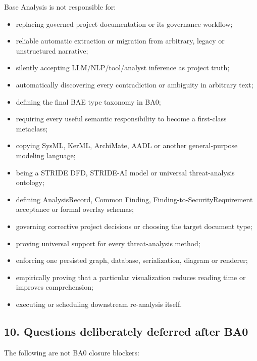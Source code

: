 \documentclass[
  10pt,
]{article}
\providecommand{\tightlist}{%
  \setlength{\itemsep}{0pt}\setlength{\parskip}{0pt}}
\begin{document}
Base Analysis is not responsible for:

\begin{itemize}
\tightlist
\item
  replacing governed project documentation or its governance workflow;
\item
  reliable automatic extraction or migration from arbitrary, legacy or
  unstructured narrative;
\item
  silently accepting LLM/NLP/tool/analyst inference as project truth;
\item
  automatically discovering every contradiction or ambiguity in
  arbitrary text;
\item
  defining the final BAE type taxonomy in BA0;
\item
  requiring every useful semantic responsibility to become a first-class
  metaclass;
\item
  copying SysML, KerML, ArchiMate, AADL or another general-purpose
  modeling language;
\item
  being a STRIDE DFD, STRIDE-AI model or universal threat-analysis
  ontology;
\item
  defining AnalysisRecord, Common Finding,
  Finding-to-SecurityRequirement acceptance or formal overlay schemas;
\item
  governing corrective project decisions or choosing the target document
  type;
\item
  proving universal support for every threat-analysis method;
\item
  enforcing one persisted graph, database, serialization, diagram or
  renderer;
\item
  empirically proving that a particular visualization reduces reading
  time or improves comprehension;
\item
  executing or scheduling downstream re-analysis itself.
\end{itemize}

\subsection{10. Questions deliberately deferred after
BA0}\label{questions-deliberately-deferred-after-ba0}

The following are not BA0 closure blockers:
\end{document}
